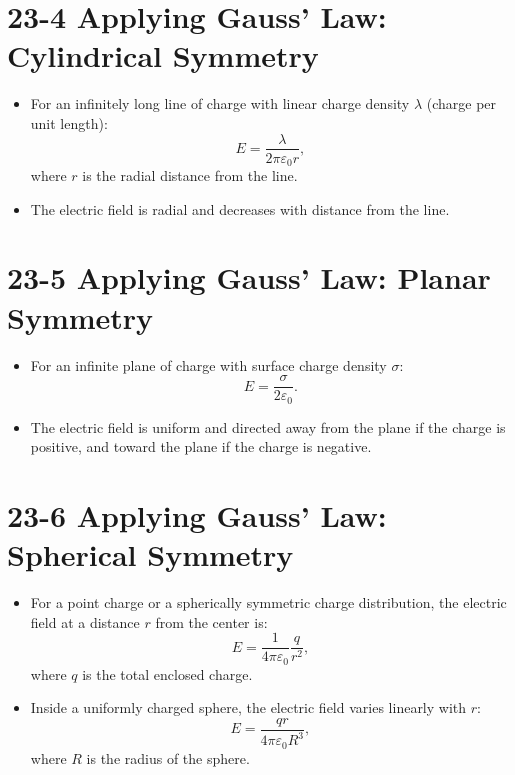 \documentclass{article}
\begin{document}
\section*{23-4 Applying Gauss’ Law: Cylindrical Symmetry}
\begin{itemize}
    \item For an infinitely long line of charge with linear charge density $\lambda$ (charge per unit length):
    \[
    E = \frac{\lambda}{2\pi\varepsilon_0 r},
    \]
    where $r$ is the radial distance from the line.
    \item The electric field is radial and decreases with distance from the line.
\end{itemize}

\section*{23-5 Applying Gauss’ Law: Planar Symmetry}
\begin{itemize}
    \item For an infinite plane of charge with surface charge density $\sigma$:
    \[
    E = \frac{\sigma}{2\varepsilon_0}.
    \]
    \item The electric field is uniform and directed away from the plane if the charge is positive, and toward the plane if the charge is negative.
\end{itemize}

\section*{23-6 Applying Gauss’ Law: Spherical Symmetry}
\begin{itemize}
    \item For a point charge or a spherically symmetric charge distribution, the electric field at a distance $r$ from the center is:
    \[
    E = \frac{1}{4\pi\varepsilon_0} \frac{q}{r^2},
    \]
    where $q$ is the total enclosed charge.
    \item Inside a uniformly charged sphere, the electric field varies linearly with $r$:
    \[
    E = \frac{q r}{4\pi\varepsilon_0 R^3},
    \]
    where $R$ is the radius of the sphere.
\end{itemize}
\end{document}
